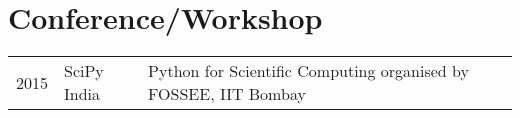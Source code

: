 \section{Conference/Workshop}
\begin{tabular}{rll}
2015	     & SciPy India  & Python for Scientific Computing organised by FOSSEE, IIT Bombay
\end{tabular}
\sectionsep
